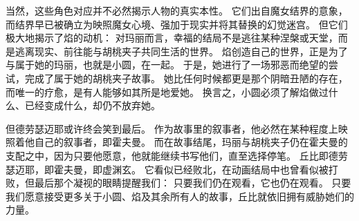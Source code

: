 当然，这些角色对应并不必然揭示人物的真实本性。
它们出自魔女结界的意象，而结界早已被确立为映照魔女心境、强加于现实并将其替换的幻觉迷宫。
但它们极大地揭示了焰的动机：
对玛丽而言，幸福的结局不是逃往某种涅槃或天堂，而是逃离现实、前往能与胡桃夹子共同生活的世界。
焰创造自己的世界，正是为了与属于她的玛丽，也就是小圆，在一起。
于是，她进行了一场邪恶而绝望的尝试，完成了属于她的胡桃夹子故事。
她比任何时候都更是那个阴暗丑陋的存在，而唯一的疗愈，是有人能够如其所是地爱她。
换言之，小圆必须了解焰做过什么、已经变成什么，却仍不放弃她。

但德劳瑟迈耶或许终会笑到最后。
作为故事里的叙事者，他必然在某种程度上映照着他自己的叙事者，即霍夫曼。
而在故事结尾，玛丽与胡桃夹子仍在霍夫曼的支配之中，因为只要他愿意，他就能继续书写他们，直至选择停笔。
丘比即德劳瑟迈耶，即霍夫曼，即虚渊玄。
它看似已经败北，在动画结局中也曾看似被打败，但最后那个凝视的眼睛提醒我们：
只要我们仍在观看，它也仍在观看。
只要我们愿意接受更多关于小圆、焰及其余所有人的故事，丘比就依旧拥有威胁她们的力量。

